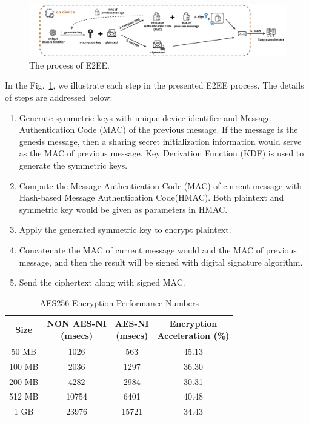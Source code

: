 \documentclass[conference]{IEEEtran}
\begin{document}
\begin{figure}[!t]
    \centering
    \includegraphics[width=\linewidth]{MAM_E2EE}
    \caption{The process of E2EE.}
    \label{fig:MAM_E2EE}
\end{figure}

In the Fig.~\ref{fig:MAM_E2EE}, we illustrate each step in the presented E2EE process. The details of steps are addressed below:

\begin{enumerate}
    \item Generate symmetric keys with unique device identifier and Message Authentication Code (MAC) of the previous message. If the message is the genesis message, then a sharing secret initialization information would serve as the MAC of previous message. Key Derivation Function (KDF) is used to generate the symmetric keys.
    \item Compute the Message Authentication Code (MAC) of current message with Hash-based Message Authentication Code(HMAC). Both plaintext and symmetric key would be given as parameters in HMAC.
    \item Apply the generated symmetric key to encrypt plaintext.
    \item Concatenate the MAC of current message would and the MAC of previous message, and then the result will be signed with digital signature algorithm.
    \item Send the ciphertext along with signed MAC.
\end{enumerate}

\begin{table}[htbp]
	\caption{AES256 Encryption Performance Numbers}
	\label{tab:AES_NI}
	\begin{center}
        \begin{tabular}{ |c||c|c|c|  }
            \hline
            Size& \makecell{NON AES-NI \\ (msecs)} & \makecell{AES-NI \\ (msecs)} & \makecell{Encryption \\ Acceleration (\%)} \\
            \hline
            50 MB  & 1026  & 563   & 45.13 \\
            100 MB & 2036  & 1297  & 36.30 \\
            200 MB & 4282  & 2984  & 30.31 \\
            512 MB & 10754 & 6401  & 40.48 \\
            1 GB   & 23976 & 15721 & 34.43 \\
            \hline
        \end{tabular}
    \end{center}
\end{table}
\end{document}
